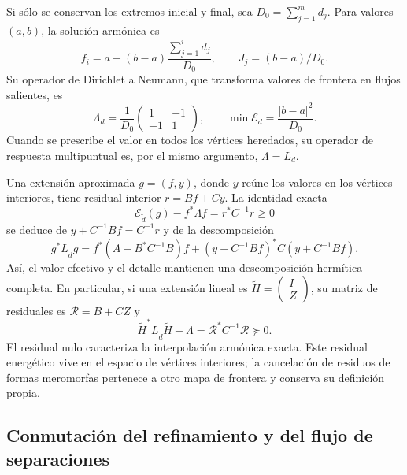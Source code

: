 Si sólo se conservan los extremos inicial y final, sea
\(D_0=\sum_{j=1}^md_j\). Para valores \((a,b)\), la solución
armónica es
\[
 f_i=a+(b-a)\frac{\sum_{j=1}^id_j}{D_0},\qquad
 J_j=(b-a)/D_0.
\]
Su operador de Dirichlet a Neumann, que transforma valores de frontera en
flujos salientes, es
\begin{equation}
 \Lambda_d=\frac1{D_0}
 \begin{pmatrix}1&-1\\-1&1\end{pmatrix},\qquad
 \min\mathcal E_d=\frac{|b-a|^2}{D_0}.
 \label{eq:dtn-intervalar-k}
\end{equation}
Cuando se prescribe el valor en todos los vértices heredados, su operador
de respuesta multipuntual es, por el mismo argumento, \(\Lambda=L_d\).

Una extensión aproximada \(g=(f,y)\), donde \(y\) reúne los valores
en los vértices interiores, tiene residual interior
\(r=Bf+Cy\). La identidad exacta
\begin{equation}
 \mathcal E_{\widetilde d}(g)-f^*\Lambda f
 =r^*C^{-1}r\ge0
 \label{eq:residual-dtn-k}
\end{equation}
se deduce de \(y+C^{-1}Bf=C^{-1}r\) y de la descomposición
\[
 g^*L_{\widetilde d}g
 =f^*(A-B^*C^{-1}B)f
 +(y+C^{-1}Bf)^*C(y+C^{-1}Bf).
\]
Así, el valor efectivo y el detalle mantienen una descomposición
hermítica completa. En particular, si una
extensión lineal es \(\widetilde H=\begin{pmatrix}I\\Z\end{pmatrix}\), su matriz de
residuales es \(\mathscr R=B+CZ\) y
\[
 \widetilde H^*L_{\widetilde d}\widetilde H-\Lambda
 =\mathscr R^*C^{-1}\mathscr R\succeq0.
\]
El residual nulo caracteriza la interpolación armónica exacta. Este
residual energético vive en el espacio de vértices interiores; la
cancelación de residuos de formas meromorfas pertenece a otro mapa de
frontera y conserva su definición propia.

\subsection{Conmutación del refinamiento y del flujo de separaciones}

